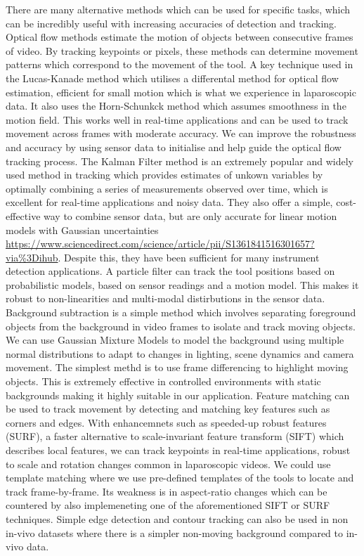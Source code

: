 There are many alternative methods which can be used for specific tasks, which can be incredibly useful with increasing accuracies of detection and tracking. Optical flow methods estimate the motion of objects between consecutive frames of video. By tracking keypoints or pixels, these methods can determine movement patterns which correspond to the movement of the tool. A key technique used in the Lucas-Kanade method which utilises a differental method for optical flow estimation, efficient for small motion which is what we experience in laparoscopic data. It also uses the Horn-Schunkck method which assumes smoothness in the motion field. This works well in real-time applications and can be used to track movement across frames with moderate accuracy. We can improve the robustness and accuracy by using sensor data to initialise and help guide the optical flow tracking process. The Kalman Filter method is an extremely popular and widely used method in tracking which provides estimates of unkown variables by optimally combining a series of measurements observed over time, which is excellent for real-time applications and noisy data. They also offer a simple, cost-effective way to combine sensor data, but are only accurate for linear motion models with Gaussian uncertainties \url{https://www.sciencedirect.com/science/article/pii/S1361841516301657?via%3Dihub}. Despite this, they have been sufficient for many instrument detection applications. A particle filter can track the tool positions based on probabilistic models, based on sensor readings and a motion model. This makes it robust to non-linearities and multi-modal distirbutions in the sensor data. Background subtraction is a simple method which involves separating foreground objects from the background in video frames to isolate and track moving objects. We can use Gaussian Mixture Models to model the background using multiple normal distributions to adapt to changes in lighting, scene dynamics and camera movement. The simplest methd is to use frame differencing to highlight moving objects. This is extremely effective in controlled environments with static backgrounds making it highly suitable in our application. Feature matching can be used to track movement by detecting and matching key features such as corners and edges. With enhancemnets such as speeded-up robust features (SURF), a faster alternative to scale-invariant feature transform (SIFT) which describes local features, we can track keypoints in real-time applications, robust to scale and rotation changes common in laparoscopic videos. We could use template matching where we use pre-defined templates of the tools to locate and track frame-by-frame. Its weakness is in aspect-ratio changes which can be countered by also implemeneting one of the aforementioned SIFT or SURF techniques. Simple edge detection and contour tracking can also be used in non in-vivo datasets where there is a simpler non-moving background compared to in-vivo data.

